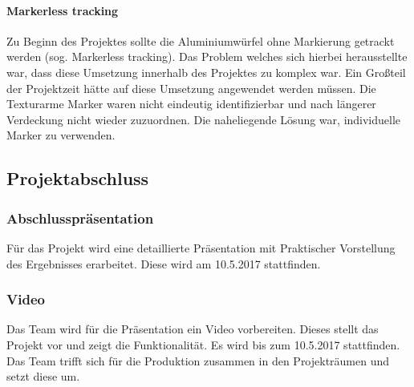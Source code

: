 \paragraph{Markerless tracking}
 Zu Beginn des Projektes sollte die Aluminiumwürfel ohne Markierung getrackt werden (sog. Markerless tracking). Das Problem welches sich hierbei herausstellte war, dass diese Umsetzung innerhalb des Projektes zu komplex war. Ein Großteil der Projektzeit hätte auf diese Umsetzung angewendet werden müssen. Die Texturarme Marker waren nicht eindeutig identifizierbar und nach längerer Verdeckung nicht wieder zuzuordnen. Die naheliegende Lösung war, individuelle Marker zu verwenden.


\subsection{Projektabschluss}
\subsubsection{Abschlusspräsentation}
Für das Projekt wird eine detaillierte Präsentation mit Praktischer Vorstellung des Ergebnisses erarbeitet. Diese wird am 10.5.2017 stattfinden.
 \subsubsection{Video}
Das Team wird für die Präsentation ein Video vorbereiten. Dieses stellt das Projekt vor und zeigt die Funktionalität. Es wird bis zum 10.5.2017 stattfinden. Das Team trifft sich für die Produktion zusammen in den Projekträumen und setzt diese um.


